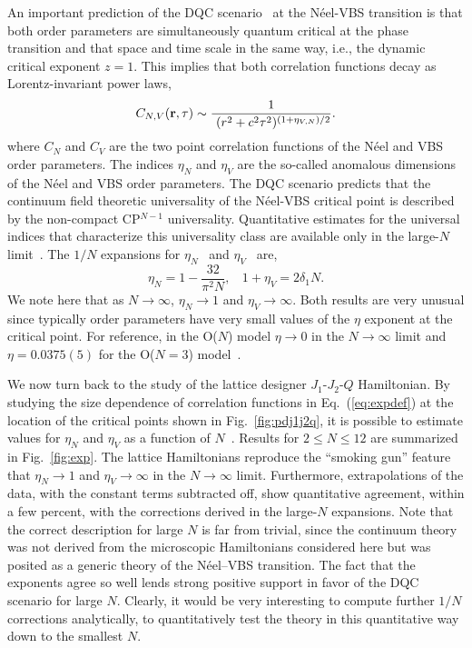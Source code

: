 \documentclass[range]{ar2e}
\begin{document}
An important prediction of the DQC scenario~\cite{Senthil04a} at the N\'eel-VBS transition is that both order parameters are
simultaneously quantum critical at the phase transition and that space and time scale in the same way, i.e., the dynamic critical 
exponent $z=1$. This implies that both correlation functions decay as Lorentz-invariant power laws,
\begin{equation}
\label{eq:expdef}
C_{N,V} ({\bf r},\tau) \sim  \frac{1}{~(r^2+c^2\tau^2)^{(1+\eta_{V,N})/2}}.
\end{equation}
 where $C_N$ and $C_V$ are the two point correlation functions of the
 N\'eel and VBS order parameters. The indices $\eta_N$ and $\eta_V$
 are the so-called anomalous dimensions of the N\'eel and VBS order
 parameters. The DQC scenario predicts that
 the continuum field theoretic universality of the N\'eel-VBS critical
 point is described by the non-compact CP$^{N-1}$ universality. Quantitative
 estimates for the universal indices that characterize this
 universality class are available only in the large-$N$
 limit~\cite{halperin1974:largeN}. The ${1}/{N}$ expansions for $\eta_N$~\cite{kaul2008:u1} and $\eta_V$~\cite{murthy1990:mono,metlitski2008:mono} are,
\begin{equation}
\label{eq:oneonN}
\eta_N = 1 - \frac{32}{\pi^2N},~~~~
1+\eta_V = 2 \delta_1 N.
\end{equation}
We note here that as $N\rightarrow\infty$, $\eta_N \rightarrow 1$ and
$\eta_V\rightarrow \infty$. Both results are very unusual since
typically order parameters have very small values of the $\eta$
exponent at the critical point. For reference, in the O($N$) model $\eta\rightarrow
0$ in the $N\rightarrow\infty$ limit and $\eta=0.0375(5)$ for the O($N=3$) model~\cite{campostrini2002:o3}.

We now turn back to the study of the lattice designer $J_1$-$J_2$-$Q$ Hamiltonian. By studying the size dependence of correlation 
functions in Eq.~(\ref{eq:expdef}) at the location of the critical points shown in Fig.~\ref{fig:pdj1j2q}, it is possible to
estimate values for $\eta_N$ and $\eta_V$ as a function of $N$~\cite{lou2009:sun,kaul2011:j1j2}. Results for $2\leq N \leq 12$ are 
summarized in Fig.~\ref{fig:exp}. The lattice Hamiltonians reproduce the ``smoking gun'' feature that $\eta_N \to 1$ and $\eta_V \to \infty$ in 
the $N\rightarrow \infty$ limit. Furthermore, extrapolations of the data, with the constant terms subtracted off, show quantitative 
agreement, within a few percent, with the corrections derived in the large-$N$ expansions. Note that the correct description for large 
$N$ is far from trivial, since the continuum theory was not derived from the microscopic Hamiltonians considered here but was posited as a 
generic theory of the N\'eel--VBS transition. The fact that the exponents agree so well lends strong positive support in favor of the DQC 
scenario for large $N$. Clearly, it would be very interesting to compute further $1/N$ corrections analytically, to quantitatively test the 
theory in this quantitative way down to the smallest $N$.
\end{document}
